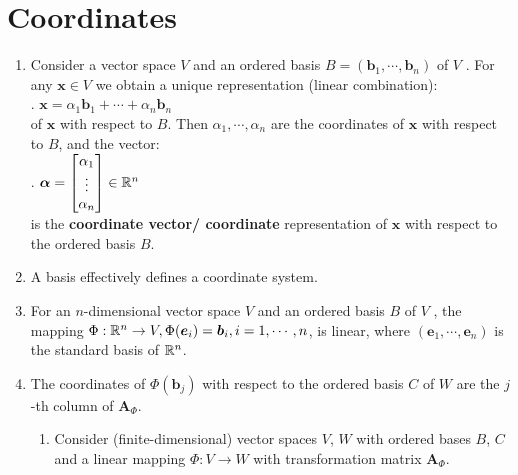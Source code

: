 \section{Coordinates}

\begin{enumerate}
    \item Consider a vector space $V$ and an ordered basis $B = (\bm{b}_1, \cdots , \bm{b}_n)$ of $V$ . 
    For any $\bm{x} \in V$ we obtain a unique representation (linear combination):
    \hfill \cite{mfml/book/mml/Deisenroth-Faisal-Ong}
    \\
    .\hfill
    $
        \bm{x} = \alpha_1 \bm{b}_1 + \cdots + \alpha_n \bm{b}_n
    $
    \hfill \cite{mfml/book/mml/Deisenroth-Faisal-Ong}
    \\
    of $\bm{x}$ with respect to $B$. 
    Then $\alpha_1, \cdots , \alpha_n$ are the coordinates of $\bm{x}$ with respect to $B$, and the vector:
    \hfill \cite{mfml/book/mml/Deisenroth-Faisal-Ong}
    \\
    .\hfill
    $
        \bm{\alpha} = \begin{bmatrix}
            \alpha_1 \\
            \vdots \\
            \alpha_n
        \end{bmatrix}
        \in \mathbb{R}^n
    $
    \hfill \cite{mfml/book/mml/Deisenroth-Faisal-Ong}
    \\
    is the \textbf{coordinate vector/ coordinate} representation of $\bm{x}$ with respect to the ordered basis $B$.
    \hfill \cite{mfml/book/mml/Deisenroth-Faisal-Ong}

    \item A basis effectively defines a coordinate system.
    \hfill \cite{mfml/book/mml/Deisenroth-Faisal-Ong}

    \item For an $n$-dimensional vector space $V$ and an ordered basis $B$ of $V$ , the mapping $\Phi : \mathbb{R}^n \to V , \Phi(\bm{e}_i) = \bm{b}_i , i = 1, \cdots , n$, is linear, where $(\bm{e}_1, \cdots , \bm{e}_n)$ is the standard basis of $\mathbb{R}^n$.
    \hfill \cite{mfml/book/mml/Deisenroth-Faisal-Ong}

    \item The coordinates of $\Phi(\bm{b}_j )$ with respect to the ordered basis $C$ of $W$ are the $j$-th column of $\bm{A}_\Phi$.
    \hfill \cite{mfml/book/mml/Deisenroth-Faisal-Ong}
    \hfill \cite{mfml/book/mml/Deisenroth-Faisal-Ong}
    \begin{enumerate}
        \item Consider (finite-dimensional) vector spaces $V$, $W$ with ordered bases $B$, $C$ and a linear mapping $\Phi : V \to W$ with transformation matrix $\bm{A}_\Phi$.
        \hfill \cite{mfml/book/mml/Deisenroth-Faisal-Ong}


\end{enumerate}
\end{enumerate}
